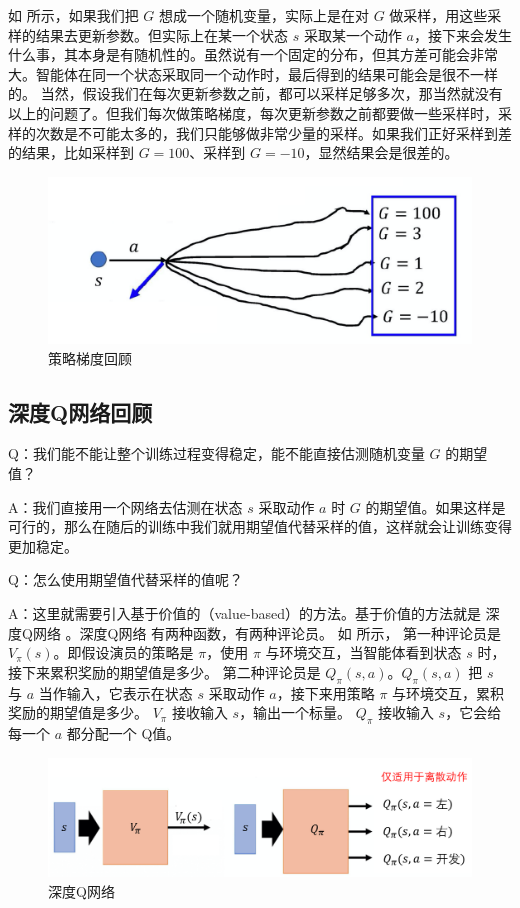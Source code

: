如 所示，如果我们把 $G$ 想成一个随机变量，实际上是在对 $G$ 做采样，用这些采样的结果去更新参数。但实际上在某一个状态 $s$ 采取某一个动作 $a$，接下来会发生什么事，其本身是有随机性的。虽然说有一个固定的分布，但其方差可能会非常大。智能体在同一个状态采取同一个动作时，最后得到的结果可能会是很不一样的。
当然，假设我们在每次更新参数之前，都可以采样足够多次，那当然就没有以上的问题了。但我们每次做策略梯度，每次更新参数之前都要做一些采样时，采样的次数是不可能太多的，我们只能够做非常少量的采样。如果我们正好采样到差的结果，比如采样到 $G = 100$、采样到 $G = -10$，显然结果会是很差的。

\begin{figure}[hbt]
  \centering
  \includegraphics[width=0.4\linewidth]{res/ch9/9.1}
  \caption{策略梯度回顾}
  \label{fig:fig9.1}
\end{figure}

\subsection{深度Q网络回顾}

Q：我们能不能让整个训练过程变得稳定，能不能直接估测随机变量 $G$ 的期望值？

A：我们直接用一个网络去估测在状态 $s$ 采取动作 $a$ 时 $G$ 的期望值。如果这样是可行的，那么在随后的训练中我们就用期望值代替采样的值，这样就会让训练变得更加稳定。

Q：怎么使用期望值代替采样的值呢？

A：这里就需要引入基于价值的（value-based）的方法。基于价值的方法就是 深度Q网络 。深度Q网络 有两种函数，有两种评论员。
如 所示，
  第一种评论员是 $V_{\pi}(s)$。即假设演员的策略是 $\pi$，使用 $\pi$ 与环境交互，当智能体看到状态 $s$ 时，接下来累积奖励的期望值是多少。
  第二种评论员是 $Q_{\pi}(s,a)$。$Q_{\pi}(s,a)$ 把 $s$ 与 $a$ 当作输入，它表示在状态 $s$ 采取动作 $a$，接下来用策略 $\pi$ 与环境交互，累积奖励的期望值是多少。
  $V_{\pi}$ 接收输入 $s$，输出一个标量。
  $Q_{\pi}$ 接收输入 $s$，它会给每一个 $a$ 都分配一个 Q值。


\begin{figure}[hbt]
  \centering
  \includegraphics[width=0.7\linewidth]{res/ch9/9.2}
  \caption{深度Q网络}
  \label{fig:fig9.2}
\end{figure}

